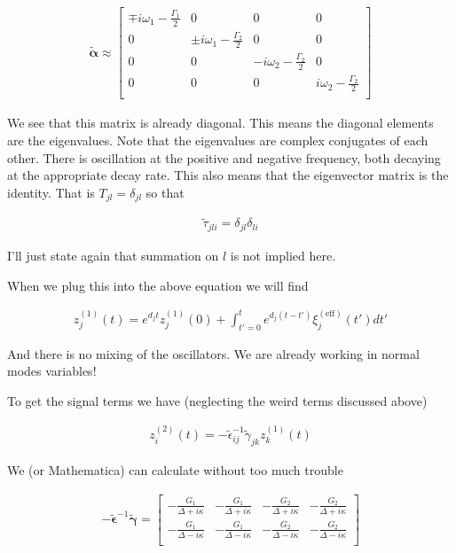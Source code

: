 \documentclass[12pt]{article}
\newcommand{\bv}[1]{\boldsymbol{#1}}
\begin{document}
\begin{align}
\tilde{\bv{\alpha}} \approx
\begin{bmatrix}
\mp i\omega_1 - \frac{\Gamma_1}{2} & 0 & 0 & 0\\
0 & \pm i\omega_1 - \frac{\Gamma_2}{2} & 0 & 0\\
0 & 0 & -i\omega_2 - \frac{\Gamma_2}{2} & 0\\
0 & 0 & 0 & i\omega_2 - \frac{\Gamma_2}{2}\\
\end{bmatrix}
\end{align}

We see that this matrix is already diagonal. This means the diagonal elements are the eigenvalues. Note that the eigenvalues are complex conjugates of each other. There is oscillation at the positive and negative frequency, both decaying at the appropriate decay rate. This also means that the eigenvector matrix is the identity. That is $T_{jl} = \delta_{jl}$ so that

\begin{align}
\tilde{\tau}_{jli} = \delta_{jl}\delta_{li}
\end{align}

I'll just state again that summation on $l$ is not implied here.

When we plug this into the above equation we will find

\begin{align}
z^{(1)}_{j}(t) = e^{d_j t}z^{(1)}_{j}(0) + \int_{t'=0}^t e^{d_j(t-t')}\xi^{(\text{eff})}_{j}(t') dt'
\end{align}

And there is no mixing of the oscillators. We are already working in normal modes variables!

To get the signal terms we have (neglecting the weird terms discussed above)

\begin{align}
z^{(2)}_{i}(t) = -\tilde{\epsilon}^{-1}_{ij}\tilde{\gamma}_{jk}z^{(1)}_{k}(t)
\end{align}

We (or Mathematica) can calculate without too much trouble

\begin{align}
-\tilde{\bv{\epsilon}}^{-1}\tilde{\bv{\gamma}} = 
\begin{bmatrix}
-\frac{G_1}{\Delta+i\kappa} & -\frac{G_1}{\Delta+i\kappa} & -\frac{G_2}{\Delta+i\kappa} & -\frac{G_2}{\Delta+i\kappa}\\
-\frac{G_1}{\Delta-i\kappa} & -\frac{G_1}{\Delta-i\kappa} & -\frac{G_2}{\Delta-i\kappa} & -\frac{G_2}{\Delta-i\kappa}\\
\end{bmatrix}
\end{align}
\end{document}
